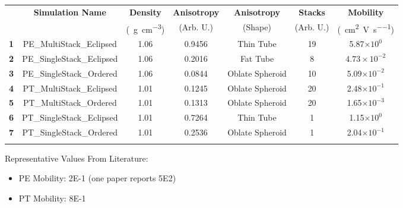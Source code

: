 \documentclass[12pt]{article}
\def\mobunits{\square\centi\meter\per\volt\per\second}
\def\gcm{\gram\per\cubic\centi\meter}
\def\ccg{\cellcolor{gray}}
\begin{document}
\begin{center}
\begin{tabular}{| c | c | c | c | c | c | c |}
\hline
\rule{0pt}{2.5ex} 
\multirow{2}{*}{\textbf{ID}}&\multirow{2}{*}{\textbf{Simulation Name}}&\textbf{Density}&\textbf{Anisotropy}&\textbf{Anisotropy}&\textbf{Stacks}&\textbf{Mobility}\\
                            &&(\SI{}{\gcm})&(Arb. U.)&(Shape)&(Arb. U.)&(\SI{}{\mobunits})\\
\hhline{|=======|}
\textbf{\ccg1}&\rule{0pt}{2.5ex}\ccg PE\_MultiStack\_Eclipsed&\ccg 1.06&\ccg 0.9456&\ccg Thin Tube&\ccg19&\ccg5.87$\times 10^{0}$\\
\textbf{2}&\rule{0pt}{2.5ex}PE\_SingleStack\_Eclipsed&1.06&0.2016&Fat Tube&8&$4.73\times 10^{-2}$\\
\textbf{\ccg3}&\rule{0pt}{2.5ex}\ccg PE\_SingleStack\_Ordered&\ccg 1.06&\ccg 0.0844&\ccg Oblate Spheroid&\ccg10&\ccg5.09$\times 10^{-2}$\\
\hhline{|=======|}
\textbf{4}&\rule{0pt}{2.5ex}PT\_MultiStack\_Eclipsed&1.01&0.1245&Oblate Spheroid&20&2.48$\times 10^{-1}$\\
\textbf{\ccg5}&\rule{0pt}{2.5ex}\ccg PT\_MultiStack\_Ordered&\ccg 1.01&\ccg 0.1313&\ccg Oblate Spheroid&\ccg20&\ccg1.65$\times 10^{-3}$\\
\textbf{6}&\rule{0pt}{2.5ex}PT\_SingleStack\_Eclipsed&1.01&0.7264&Thin Tube&1&1.15$\times 10^{0}$\\
\textbf{\ccg7}&\rule{0pt}{2.5ex}\ccg PT\_SingleStack\_Ordered&\ccg 1.01&\ccg 0.2536&\ccg Oblate Spheroid&\ccg1&\ccg2.04$\times 10^{-1}$\\
\hhline{-------}
\end{tabular}\label{table:mob}
\end{center}

Representative Values From Literature:
\begin{itemize}
    \item{PE Mobility: 2E-1 (one paper reports 5E2)}
    \item{PT Mobility: 8E-1}
\end{itemize}
\end{document}
